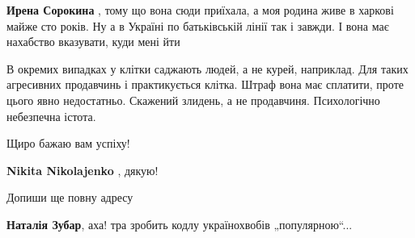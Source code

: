 \begin{itemize}
\begin{itemize}
\textbf{Ирена Сорокина} , тому що вона сюди приїхала, а моя родина живе в
харкові майже сто років. Ну а в Україні по батьківській лінії так і завжди. І
вона має нахабство вказувати, куди мені йти
\end{itemize}

 

В окремих випадках у клітки саджають людей, а не курей, наприклад. Для таких
агресивних продавчинь і практикується клітка. Штраф вона має сплатити, проте
цього явно недостатньо. Скажений злидень, а не продавчиня. Психологічно
небезпечна істота.


 
Щиро бажаю вам успіху!

\begin{itemize}
 
\textbf{Nikita Nikolajenko} , дякую!
\end{itemize}

 
Допиши ще повну адресу

\begin{itemize}
 
\textbf{Наталія Зубар}, аха! тра зробить кодлу українохвобів „популярною“...

 

\end{itemize}
\end{itemize}
